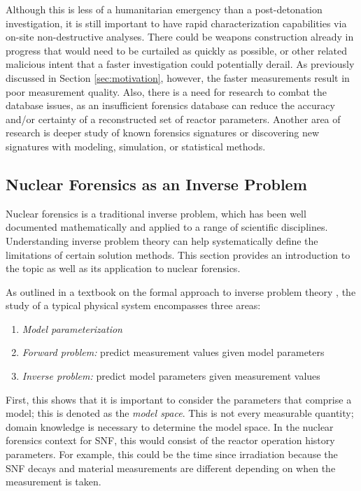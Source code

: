 Although this is less of a humanitarian emergency than a post-detonation
investigation, it is still important to have rapid characterization
capabilities via on-site non-destructive analyses.  There could be weapons
construction already in progress that would need to be curtailed as quickly as
possible, or other related malicious intent that a faster investigation could
potentially derail.  As previously discussed in Section \ref{sec:motivation},
however, the faster measurements result in poor measurement quality. Also,
there is a need for research to combat the database issues, as an insufficient
forensics database can reduce the accuracy and/or certainty of a reconstructed
set of reactor parameters.  Another area of research is deeper study of known
forensics signatures or discovering new signatures with modeling, simulation,
or statistical methods. 

\subsection{Nuclear Forensics as an Inverse Problem}
\label{sec:inverse}


Nuclear forensics is a traditional inverse problem, which has been well
documented mathematically and applied to a range of scientific disciplines.
Understanding inverse problem theory can help systematically define the
limitations of certain solution methods.  This section provides an introduction
to the topic as well as its application to nuclear forensics. 

As outlined in a textbook on the formal approach to inverse problem theory
\cite{inverse_theory}, the study of a typical physical system encompasses three
areas:
\begin{enumerate}
  \itemsep-0.75em
  \item \textit{Model parameterization}
  \item \textit{Forward problem:} predict measurement values given model parameters
  \item \textit{Inverse problem:} predict model parameters given measurement values
\end{enumerate}

First, this shows that it is important to consider the parameters that comprise
a model; this is denoted as the \textit{model space}. This is not every
measurable quantity; domain knowledge is necessary to determine the model
space. In the nuclear forensics context for \gls{SNF}, this would consist of
the reactor operation history parameters. For example, this could be the time
since irradiation because the \gls{SNF} decays and material measurements are
different depending on when the measurement is taken.

